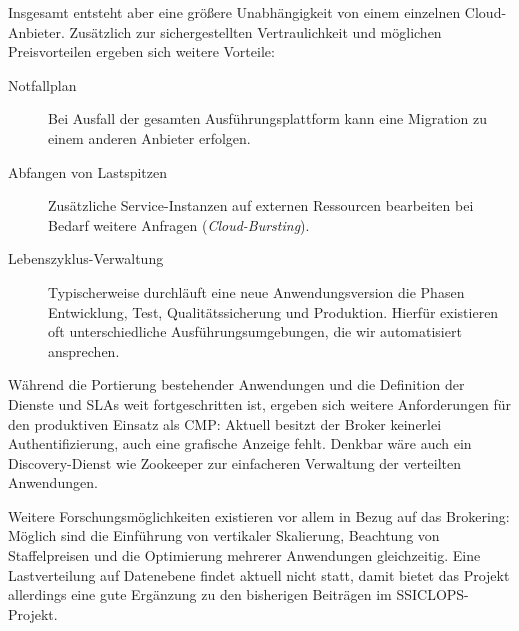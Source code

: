 Insgesamt entsteht aber eine größere Unabhängigkeit von einem einzelnen Cloud-Anbieter. Zusätzlich zur sichergestellten Vertraulichkeit und möglichen Preisvorteilen ergeben sich weitere Vorteile:

\begin{description}
	
	\item[Notfallplan] Bei Ausfall der gesamten Ausführungsplattform kann eine Migration zu einem anderen Anbieter erfolgen.
	
	\item[Abfangen von Lastspitzen] Zusätzliche Service-Instanzen auf externen Ressourcen bearbeiten bei Bedarf weitere Anfragen (\emph{Cloud-Bursting}).
	
	\item[Lebenszyklus-Verwaltung] Typischerweise durchläuft eine neue Anwendungsversion die Phasen Entwicklung, Test, Qualitätssicherung und Produktion. Hierfür existieren oft unterschiedliche Ausführungsumgebungen, die wir automatisiert ansprechen.
	
\end{description}

Während die Portierung bestehender Anwendungen und die Definition der Dienste und SLAs weit fortgeschritten ist, ergeben sich weitere Anforderungen für den produktiven Einsatz als CMP: Aktuell besitzt der Broker keinerlei Authentifizierung, auch eine grafische Anzeige fehlt. Denkbar wäre auch ein Discovery-Dienst wie Zookeeper zur einfacheren Verwaltung der verteilten Anwendungen.

Weitere Forschungsmöglichkeiten existieren vor allem in Bezug auf das Brokering: Möglich sind die Einführung von vertikaler Skalierung, Beachtung von Staffelpreisen und die Optimierung mehrerer Anwendungen gleichzeitig. Eine Lastverteilung auf Datenebene findet aktuell nicht statt, damit bietet das Projekt allerdings eine gute Ergänzung zu den bisherigen Beiträgen im SSICLOPS-Projekt.